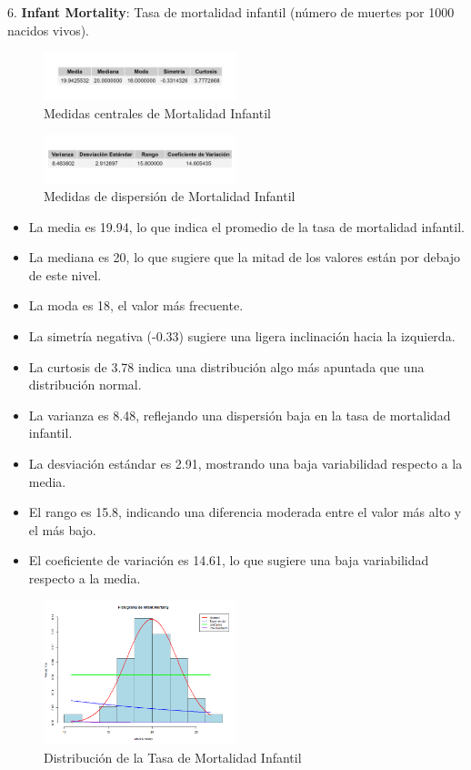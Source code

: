 \documentclass{article}
\begin{document}
6. \textbf{Infant Mortality}: Tasa de mortalidad infantil (número de muertes por 1000 nacidos vivos).
\begin{figure}[H]
 \centering
 \includegraphics[width=0.5\textwidth]{Swiss/Infant.Mortality_central.png}
 \caption{Medidas centrales de Mortalidad Infantil}
\end{figure}

\begin{figure}[H]
    \centering
    \includegraphics[width=0.5\textwidth]{Swiss/Infant.Mortality_dispersion.png}
    \caption{Medidas de dispersión de Mortalidad Infantil}
\end{figure}
\begin{itemize}
    \item La media es 19.94, lo que indica el promedio de la tasa de mortalidad infantil.
    \item La mediana es 20, lo que sugiere que la mitad de los valores están por debajo de este nivel.
    \item La moda es 18, el valor más frecuente.
    \item La simetría negativa (-0.33) sugiere una ligera inclinación hacia la izquierda.
    \item La curtosis de 3.78 indica una distribución algo más apuntada que una distribución normal.
    \item La varianza es 8.48, reflejando una dispersión baja en la tasa de mortalidad infantil.
    \item La desviación estándar es 2.91, mostrando una baja variabilidad respecto a la media.
    \item El rango es 15.8, indicando una diferencia moderada entre el valor más alto y el más bajo.
    \item El coeficiente de variación es 14.61, lo que sugiere una baja variabilidad respecto a la media.
\end{itemize}

\begin{figure}[H]
\centering
\includegraphics[width=0.5\textwidth]{Histogramas/histogram_infant_mortality.png}
\caption{Distribución de la Tasa de Mortalidad Infantil}
\end{figure}
\end{document}
